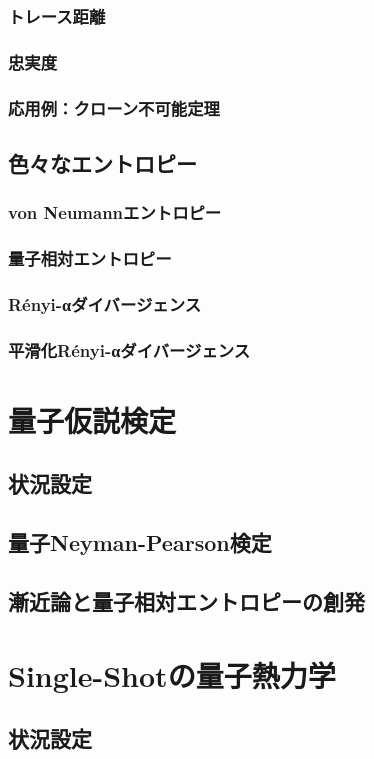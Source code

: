 \documentclass[report]{jlreq}
\begin{document}
\subsection{トレース距離}
\subsection{忠実度}
\subsection{応用例：クローン不可能定理}
\section{色々なエントロピー}
\subsection{von Neumannエントロピー}
\subsection{量子相対エントロピー}
\subsection{R\'{e}nyi-αダイバージェンス}
\subsection{平滑化R\'{e}nyi-αダイバージェンス}

\chapter{量子仮説検定}
\section{状況設定}
\section{量子Neyman-Pearson検定}
\section{漸近論と量子相対エントロピーの創発}

\chapter{Single-Shotの量子熱力学}
\section{状況設定}
\end{document}

